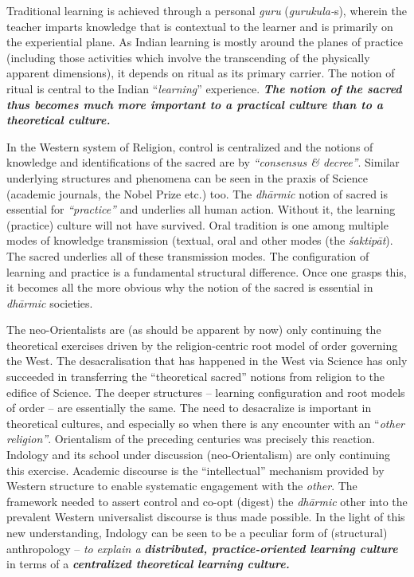 Traditional learning is achieved through a personal \textit{guru} \hbox{(\textit{gurukula-}s)}, wherein the teacher imparts knowledge that is contextual to the learner and is primarily on the experiential plane. As Indian learning is mostly around the planes of practice (including those activities which involve the transcending of the physically apparent dimensions), it depends on ritual as its primary carrier. The notion of ritual is central to the Indian “\textit{learning}” experience. \textbf{\textit{The notion of the sacred thus becomes much more important to a practical culture than to a theoretical culture.}}

In the Western system of Religion, control is centralized and the notions of knowledge and identifications of the sacred are by \textit{“consensus \& decree”}. Similar underlying structures and phenomena can be seen in the praxis of Science (academic journals, the Nobel Prize etc.) too. The \textit{dhārmic} notion of sacred is essential for \textit{“practice”} and underlies all human action. Without it, the learning (practice) culture will not have survived. Oral tradition is one among multiple modes of knowledge transmission (textual, oral and other modes (the \textit{śaktipāt}). The sacred underlies all of these transmission modes. The configuration of learning and practice is a fundamental structural difference. Once one grasps this, it becomes all the more obvious why the notion of the sacred is essential in \textit{dhārmic} societies.

The neo-Orientalists are (as should be apparent by now) only continuing the theoretical exercises driven by the religion-centric root model of order governing the West. The desacralisation that has happened in the West via Science has only succeeded in transferring the “theoretical sacred” notions from religion to the edifice of Science. The deeper structures – learning configuration and root models of order – are essentially the same. The need to desacralize is important in theoretical cultures, and especially so when there is any encounter with an “\textit{other religion”}. Orientalism of the preceding centuries was precisely this reaction. Indology and its school under discussion (neo-Orientalism) are only continuing this exercise. Academic discourse is the “intellectual” mechanism provided by Western structure to enable systematic engagement with the \textit{other}. The framework needed to assert control and co-opt (digest) the \textit{dhārmic} other into the prevalent Western universalist discourse is thus made possible. In the light of this new understanding, Indology can be seen to be a peculiar form of (structural) anthropology – \textit{to} \textit{explain a } \textbf{\textit{distributed, practice-oriented learning culture}} in terms of a \textbf{\textit{centralized theoretical learning culture.}}


